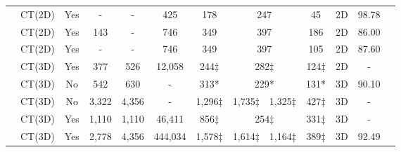 \documentclass[letterpaper]{article}
\begin{document}
\begin{table}[!ht]
{\begin{tabular}{|c|c|c|c|c|c|c|c|c|c|c|c|c|}
 \cite{Alom} & CT(2D) & Yes & - & - & 425 & 178 & \multicolumn{2}{c|}{247} & 45 & 2D & 98.78 \\\cline{8-9}
 \cite{He2020} & CT(2D) & Yes & 143 & - & 746 & 349 & \multicolumn{2}{c|}{397} & 186 & 2D & 86.00  \\\cline{8-9}
 \cite{Mobiny2020} & CT(2D) & Yes & - & - & 746 & 349 & \multicolumn{2}{c|}{397} & 105 & 2D & 87.60 \\\cline{8-9}
 \cite{covid-ctset} & CT(3D) & Yes & 377 & 526 & 12,058 & 244$\ddagger$ & \multicolumn{2}{c|}{282$\ddagger$} & {124$\ddagger$} & 2D & - \\\cline{8-9}
 \cite{Zheng2020} & CT(3D) & No & 542 & 630 & - & 313* & \multicolumn{2}{c|}{229*} & {131*} & 3D & 90.10 \\\cline{8-9}
 \cite{li2020artificial} & CT(3D) & No & 3,322 & 4,356 & - & 1,296$\ddagger$ & 1,735$\ddagger$& 1,325$\ddagger$ & 427$\ddagger$ & 3D & - \\\cline{8-9}
 \cite{mosmeddata} & CT(3D) & Yes & 1,110 & 1,110 & 46,411 & 856$\ddagger$ & \multicolumn{2}{c|}{254$\ddagger$} & {331$\ddagger$} & 3D & - \\\cline{8-9}
 
 
 \cite{cell_covid} & CT(3D) & Yes & 2,778 & 4,356 & 444,034 & 1,578$\ddagger$ & 1,614$\ddagger$ & 1,164$\ddagger$ & 389$\ddagger$ & 3D & 92.49\\\hline
\end{tabular}
}
\label{table:dataset_review}
\end{table}
\end{document}
